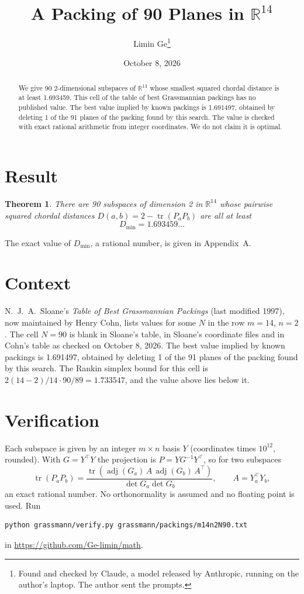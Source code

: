 \documentclass[11pt,a4paper]{article}
\title{A Packing of 90 Planes in $\mathbb{R}^{14}$}
\author{Limin Ge\thanks{Found and checked by Claude, a model released by Anthropic, running on the author's laptop. The author sent the prompts.}}
\date{October 8, 2026}
\newtheorem*{theorem}{Theorem}
\begin{document}
\maketitle
\begin{abstract}
We give 90 2-dimensional subspaces of $\mathbb{R}^{14}$ whose smallest squared chordal distance is at least 1.693459. This cell of the table of best Grassmannian packings has no published value. The best value implied by known packings is 1.691497, obtained by deleting 1 of the 91 planes of the packing found by this search. The value is checked with exact rational arithmetic from integer coordinates. We do not claim it is optimal.
\end{abstract}

\section{Result}
\begin{theorem}
There are 90 subspaces of dimension 2 in $\mathbb{R}^{14}$ whose pairwise squared chordal distances $D(a,b) = 2 - \operatorname{tr}(P_aP_b)$ are all at least
\[ D_{\min} = 1.693459\ldots \]
\end{theorem}
The exact value of $D_{\min}$, a rational number, is given in Appendix~A.


\section{Context}
N.~J.~A.~Sloane's \emph{Table of Best Grassmannian Packings} (last modified 1997), now maintained by Henry Cohn, lists values for some $N$ in the row $m=14$, $n=2$. The cell $N=90$ is blank in Sloane's table, in Sloane's coordinate files and in Cohn's table as checked on October 8, 2026. The best value implied by known packings is 1.691497, obtained by deleting 1 of the 91 planes of the packing found by this search. The Rankin simplex bound for this cell is $2(14-2)/14\cdot 90/89 = 1.733547$, and the value above lies below it.


\section{Verification}
Each subspace is given by an integer $m\times n$ basis $Y$ (coordinates times $10^{12}$, rounded). With $G=Y^\top Y$ the projection is $P=YG^{-1}Y^\top$, so for two subspaces
\[ \operatorname{tr}(P_aP_b)=\frac{\operatorname{tr}(\operatorname{adj}(G_a)\,A\,\operatorname{adj}(G_b)\,A^\top)}{\det G_a\det G_b},\qquad A=Y_a^\top Y_b, \]
an exact rational number. No orthonormality is assumed and no floating point is used. Run
\begin{verbatim}
python grassmann/verify.py grassmann/packings/m14n2N90.txt
\end{verbatim}
in \url{https://github.com/Ge-limin/math}.
\end{document}
